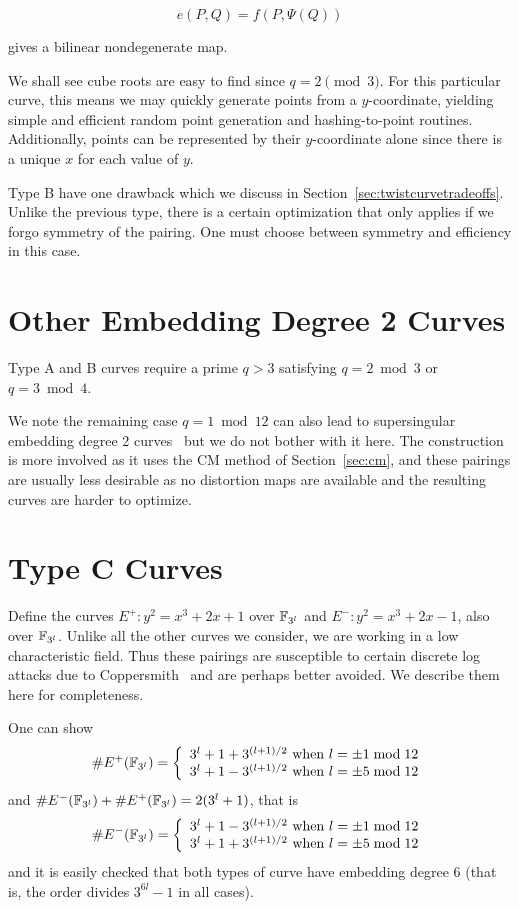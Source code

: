 \[ e(P,Q) = f(P, \Psi(Q)) \]

gives a bilinear nondegenerate map.

We shall see cube roots are easy to find since $q = 2 \pmod{3}$.
For this particular curve, this means we may quickly generate points from
a $y$-coordinate, yielding simple and efficient random point generation and
hashing-to-point routines.
Additionally,
points can be represented by their $y$-coordinate alone since there is
a unique $x$ for each value of $y$.

Type B have one drawback which we discuss in
Section~\ref{sec:twistcurvetradeoffs}. Unlike the previous type,
there is a certain optimization that
only applies if we forgo symmetry of the pairing. One must choose between
symmetry and efficiency in this case.

\section {Other Embedding Degree 2 Curves}

Type A and B curves require a prime $q > 3$ satisfying $q = 2 \bmod 3$ or
$q = 3 \bmod 4$.

We note the remaining case $q = 1 \bmod 12$ can also lead to supersingular
embedding degree 2 curves~\cite[\S 3.2]{fst} but we do not bother with it here.
The construction is more involved as it uses the CM method of
Section~\ref{sec:cm}, and these pairings are usually
less desirable as no distortion maps are available and the resulting
curves are harder to optimize.

\section {Type C Curves}

Define the curves $E^{+} : y^2 = x^3 + 2 x + 1$ over $\mathbb{F}_{3^l}$
and $E^{-} : y^2 = x^3 + 2 x - 1$, also over $\mathbb{F}_{3^l}$.
Unlike all the other curves we consider,
we are working in a low characteristic field. Thus these pairings
are susceptible to certain discrete log attacks due to
Coppersmith~\cite{coppersmith} and are perhaps better avoided.
We describe them here for completeness.

One can show
\[
\#E^+(\mathbb{F}_{3^l}) = \left \{ \begin{array}{rcl}
3^l + 1 + 3^{(l+1)/2} \mbox { when } l = \pm 1 \bmod 12 \\
3^l + 1 - 3^{(l+1)/2} \mbox { when } l = \pm 5 \bmod 12
\end{array} \right.
\]
and $\#E^-(\mathbb{F}_{3^l}) + \#E^+(\mathbb{F}_{3^l}) = 2(3^l + 1)$, that is
\[
\#E^-(\mathbb{F}_{3^l}) = \left \{ \begin{array}{rcl}
3^l + 1 - 3^{(l+1)/2} \mbox { when } l = \pm 1 \bmod 12 \\
3^l + 1 + 3^{(l+1)/2} \mbox { when } l = \pm 5 \bmod 12
\end{array} \right.
\]
and it is easily checked that both types of curve have embedding
degree 6 (that is, the order divides $3^{6l} -1$ in all cases).

